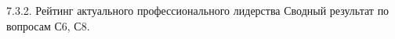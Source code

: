 \begin{frame}{7.3.2. Рейтинг актуального профессионального лидерства}
\tiny 
Сводный результат по вопросам С6, С8.

\fontsize{5pt}{5}\selectfont
\begin{center}
\begin{tabular}{cllc}

\end{tabular}
\end{center}
\end{frame}


